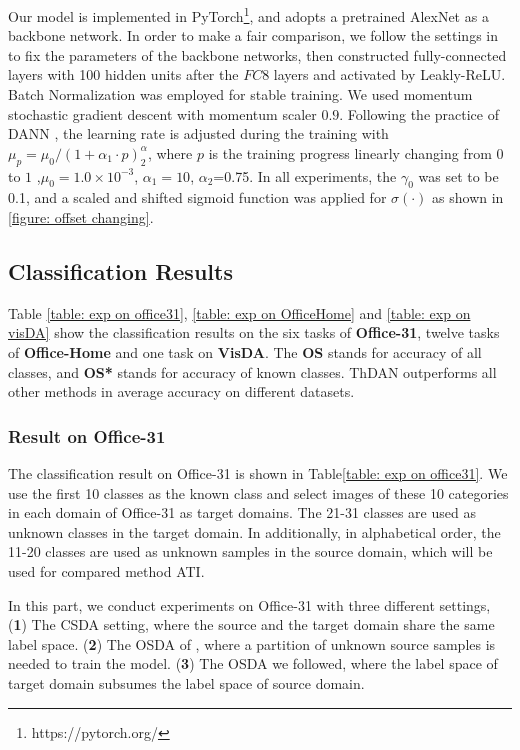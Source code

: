 Our model is implemented in PyTorch\footnote{https://pytorch.org/}, and adopts a pretrained AlexNet \cite{AlexNet} as a backbone network. 
In order to make a fair comparison, we follow the settings in \cite{OpensetDA-bp} to fix the parameters of the backbone networks, then constructed fully-connected layers with 100 hidden units after the $FC8$ layers and activated by Leakly-ReLU. 
Batch Normalization \cite{BatchNorm} was employed for stable training. 
We used momentum stochastic gradient descent with momentum scaler $0.9$. 
Following the practice of DANN \cite{DomainAdversrialNetwork}, the learning rate is adjusted during the training with $\mu_p=\mu_0/(1+\alpha_1\cdot p)^\alpha_2$, where $p$ is the training progress linearly changing from $0$ to $1$ ,$\mu_0=1.0 \times 10^{-3}$, $\alpha_1=10$, $\alpha_2$=0.75.
In all experiments, the $\gamma_0$ was set to be 0.1, and a scaled and shifted sigmoid function was applied for $\sigma(\cdot)$ as shown in \figurename{\ref{figure: offset changing}}. 




\subsection{Classification Results}

Table \ref{table: exp on office31}, \ref{table: exp on OfficeHome} and \ref{table: exp on visDA} show the classification results on the six tasks of \textbf{Office-31}, twelve tasks of \textbf{Office-Home} and one task on \textbf{VisDA}. 
The \textbf{OS} stands for accuracy of all classes, and \textbf{OS*} stands for accuracy of known classes. 
ThDAN outperforms all other methods in average accuracy on different datasets. 


\subsubsection{Result on Office-31}
The classification result on Office-31 is shown in Table\ref{table: exp on office31}. 
We use the first 10 classes as the known class and select images of these 10 categories in each domain of Office-31 as target domains. The 21-31 classes are used as unknown classes in the target domain. 
In additionally, in alphabetical order, the 11-20 classes are used as unknown samples in the source domain, which will be used for compared method ATI. 

In this part, we conduct experiments on Office-31 with three different settings,
(\textbf{1}) The CSDA setting, where the source and the target domain share the same label space.
(\textbf{2}) The OSDA of \cite{OpensetsDA}, where a partition of unknown source samples is needed to train the model.
(\textbf{3}) The OSDA we followed, where the label space of target domain subsumes the label space of source domain.

